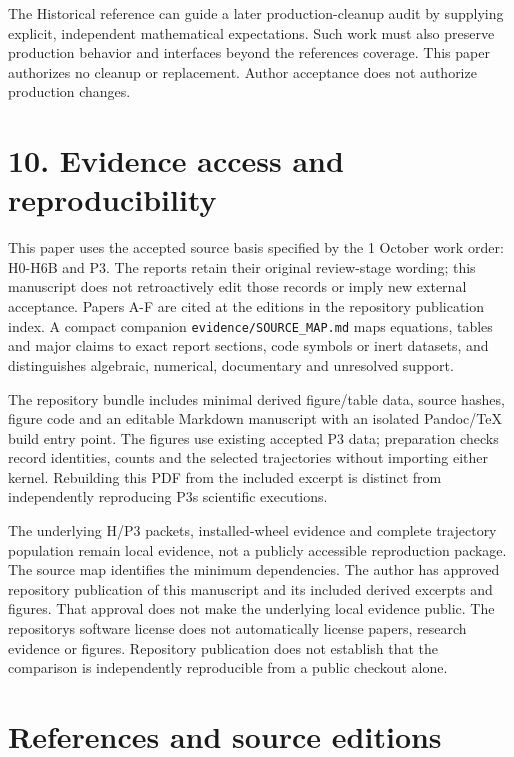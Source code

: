 \documentclass[
  11pt,
  a4paper,
]{article}
\begin{document}
The Historical reference can guide a later production-cleanup audit by supplying explicit, independent mathematical expectations. Such work must also preserve production behavior and interfaces beyond the reference\textquotesingle s coverage. This paper authorizes no cleanup or replacement. Author acceptance does not authorize production changes.

\section{10. Evidence access and reproducibility}\label{evidence-access-and-reproducibility}

This paper uses the accepted source basis specified by the 1 October work order: H0-H6B and P3. The reports retain their original review-stage wording; this manuscript does not retroactively edit those records or imply new external acceptance. Papers A-F are cited at the editions in the repository publication index. A compact companion \nolinkurl{evidence/SOURCE_MAP.md} maps equations, tables and major claims to exact report sections, code symbols or inert datasets, and distinguishes algebraic, numerical, documentary and unresolved support.

The repository bundle includes minimal derived figure/table data, source hashes, figure code and an editable Markdown manuscript with an isolated Pandoc/TeX build entry point. The figures use existing accepted P3 data; preparation checks record identities, counts and the selected trajectories without importing either kernel. Rebuilding this PDF from the included excerpt is distinct from independently reproducing P3\textquotesingle s scientific executions.

The underlying H/P3 packets, installed-wheel evidence and complete trajectory population remain local evidence, not a publicly accessible reproduction package. The source map identifies the minimum dependencies. The author has approved repository publication of this manuscript and its included derived excerpts and figures. That approval does not make the underlying local evidence public. The repository\textquotesingle s software license does not automatically license papers, research evidence or figures. Repository publication does not establish that the comparison is independently reproducible from a public checkout alone.

\section{References and source editions}\label{references-and-source-editions}
\end{document}
